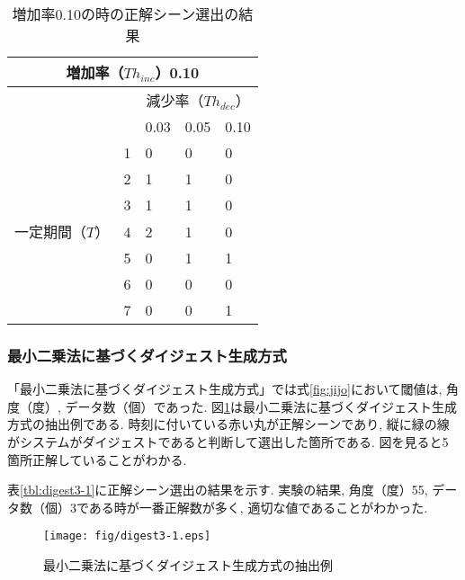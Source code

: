 \begin{table}[h]
  \caption{増加率0.10の時の正解シーン選出の結果}
  \label{tbl:digest2-2}
  \centering
      {\small
        \begin{tabular}{|l|l||l|l|l|} \hline
          \multicolumn{5}{|c|}{増加率（$Th_{inc}$）0.10} \\ \hline
          & & \multicolumn{3}{c|}{減少率（$Th_{dec}$）} \\ \hline
          & & 0.03 & 0.05 & 0.10 \\ \hline \hline \cline{2-5}
          & 1 & 0 & 0 & 0 \\ \cline{2-5}
          & 2 & 1 & 1 & 0 \\ \cline{2-5}
          & 3 & 1 & 1 & 0 \\ \cline{2-5}
          一定期間（$T$）& 4 & 2 & 1 & 0 \\ \cline{2-5}
          & 5 & 0 & 1 & 1 \\ \cline{2-5}
          & 6 & 0 & 0 & 0 \\ \cline{2-5}
          & 7 & 0 & 0 & 1 \\ \cline{2-5}
          \hline
        \end{tabular}
      }
\end{table}

\newpage

\subsubsection{最小二乗法に基づくダイジェスト生成方式}
「最小二乗法に基づくダイジェスト生成方式」では式\ref{fig:jijo}において閾値は, 角度（度）, データ数（個）であった. 図\ref{fig:digest3-1}は最小二乗法に基づくダイジェスト生成方式の抽出例である. 時刻に付いている赤い丸が正解シーンであり, 縦に緑の線がシステムがダイジェストであると判断して選出した箇所である. 図を見ると5箇所正解していることがわかる.

表\ref{tbl:digest3-1}に正解シーン選出の結果を示す. 実験の結果, 角度（度）55, データ数（個）3である時が一番正解数が多く, 適切な値であることがわかった.

\begin{figure}[h]
  \centering
  \texttt{[image: fig/digest3-1.eps]}
  \caption{最小二乗法に基づくダイジェスト生成方式の抽出例}
  \label{fig:digest3-1}
\end{figure}

